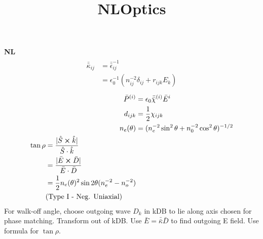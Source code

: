 \documentclass[12pt]{article}
\title{\vspace{-2em}NLOptics}
\date{}
\begin{document}
\maketitle

\vspace{-4em}
\begin{multicols}{3}

\textbf{NL}
\begin{align}
  \begin{aligned}
    \bar{\bar{\kappa}}_{ij} {}&= \bar{\bar{\epsilon}}_{ij}^{-1}\\
    &= \epsilon_0^{-1} (n_{ij}^{-2} \delta_{ij} + r_{ijk} E_k) %
  \end{aligned}
\end{align}
\begin{align}
  \bar{P}^{(i)} &= \epsilon_0 \bar{\bar{\chi}}^{(i)} \bar{E}^{i}\\
  d_{ijk} &= \frac{1}{2} \chi_{ijk}\\ %
  n_{e}(\theta) &= (n_e^{-2}\sin^2\theta + n_0^{-2}\cos^2\theta)^{-1/2}\\ %
  \begin{split}
    \tan\rho &{}= \frac{\lvert\hat{S} \cross \hat{k}\rvert}{\hat{S} \cdot \hat{k}}\\
    &= \frac{\lvert \bar{E} \cross \bar{D} \rvert}{\bar{E} \cdot \bar{D}}\\
    &= \frac{1}{2}n_e(\theta)^2\sin2\theta(n_e^{-2} - n_o^{-2} )\\
    &(\textrm{Type I - Neg. Uniaxial})
  \end{split}
\end{align}
For walk-off angle, choose outgoing wave $D_k$ in kDB to lie along axis chosen for phase matching.
Transform out of kDB. Use $\bar{E} = \bar{\bar{\kappa}} \bar{D}$ to find outgoing E field. Use
formula for $\tan\rho$.


\end{multicols}
\end{document}
